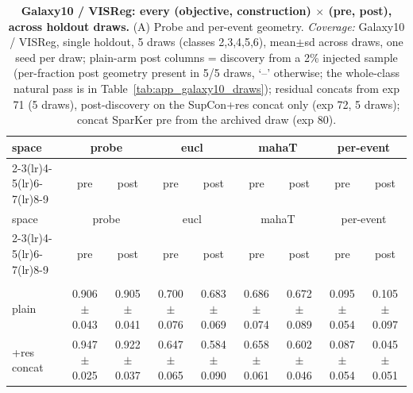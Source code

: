 \begin{landscape}
\begin{center}
\footnotesize
\setlength{\tabcolsep}{3pt}
\begin{longtable}{lcccccccc}
\caption{\textbf{Galaxy10 / VISReg: every (objective, construction) $\times$ (pre, post), across holdout draws.} (A) Probe and per-event geometry. \emph{Coverage:} Galaxy10 / VISReg, single holdout, 5 draws (classes 2,3,4,5,6), mean$\pm$sd across draws, one seed per draw; plain-arm post columns = discovery from a 2\% injected sample (per-fraction post geometry present in 5/5 draws, `--' otherwise; the whole-class natural pass is in Table~\ref{tab:app_galaxy10_draws}); residual concats from exp 71 (5 draws), post-discovery on the SupCon+res concat only (exp 72, 5 draws); concat SparKer pre from the archived draw (exp 80).}\label{tab:grid_galaxy10_visreg_a}\\
\toprule
space & \multicolumn{2}{c}{probe} & \multicolumn{2}{c}{eucl} & \multicolumn{2}{c}{mahaT} & \multicolumn{2}{c}{per-event} \\
\cmidrule(lr){2-3}\cmidrule(lr){4-5}\cmidrule(lr){6-7}\cmidrule(lr){8-9}
& pre & post & pre & post & pre & post & pre & post \\
\midrule
\endfirsthead
\toprule
space & \multicolumn{2}{c}{probe} & \multicolumn{2}{c}{eucl} & \multicolumn{2}{c}{mahaT} & \multicolumn{2}{c}{per-event} \\
\cmidrule(lr){2-3}\cmidrule(lr){4-5}\cmidrule(lr){6-7}\cmidrule(lr){8-9}
& pre & post & pre & post & pre & post & pre & post \\
\midrule
\endhead
\bottomrule
\endfoot
\multicolumn{9}{l}{\emph{SupCon}} \\
\quad plain & 0.906$\pm$0.043 & 0.905$\pm$0.041 & 0.700$\pm$0.076 & 0.683$\pm$0.069 & 0.686$\pm$0.074 & 0.672$\pm$0.089 & 0.095$\pm$0.054 & 0.105$\pm$0.097 \\
\quad +res concat & 0.947$\pm$0.025 & 0.922$\pm$0.037 & 0.647$\pm$0.065 & 0.584$\pm$0.090 & 0.658$\pm$0.061 & 0.602$\pm$0.046 & 0.087$\pm$0.054 & 0.045$\pm$0.051 \\

\end{longtable}
\end{center}
\end{landscape}
